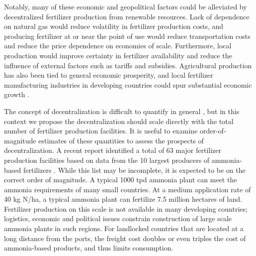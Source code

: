 Notably, many of these economic and geopolitical factors could be alleviated by decentralized fertilizer production from renewable resources. Lack of dependence on natural gas would reduce volatility in fertilizer production costs\cite{Etienne2016}, and producing fertilizer at or near the point of use would reduce transportation costs and reduce the price dependence on economies of scale. Furthermore, local production would improve certainty in fertilizer availability and reduce the influence of external factors such as tariffs and subsidies. Agricultural production has also been tied to general economic prosperity, and local fertilizer manufacturing industries in developing countries could spur substantial economic growth \cite{McArthur_2017}.

The concept of decentralization is difficult to quantify in general \cite{Schneider_2003}, but in this context we propose the decentralization should scale directly with the total number of fertilizer production facilities. It is useful to examine order-of-magnitude estimates of these quantities to assess the prospects of decentralization. A recent report identified a total of 63 major fertilizer production facilities based on data from the 10 largest producers of ammonia-based fertilizers \cite{McArthur_2017}. While this list may be incomplete, it is expected to be on the correct order of magnitude. A typical 1000 tpd ammonia plant can meet the ammonia requirements of many small countries. At a medium application rate of 40 kg N/ha, a typical ammonia plant can fertilize 7.5 million hectares of land. Fertilizer production on this scale is not available in many developing countries; logistics, economic and political issues constrain construction of large scale ammonia plants in such regions.\cite{IFDC_1998} 
For landlocked countries that are located at a long distance from the ports, the freight cost doubles or even triples the cost of ammonia-based products, and thus limits consumption.
